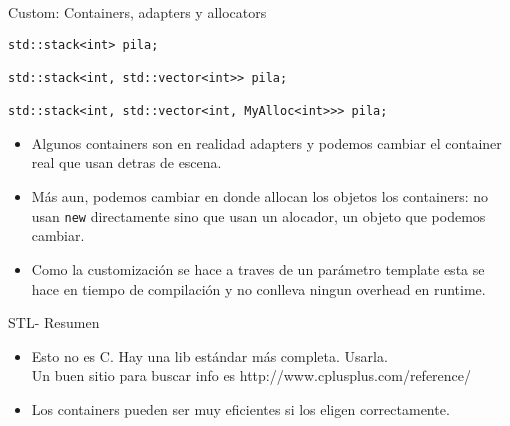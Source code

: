 \begin{frame}[fragile]{Custom: Containers, adapters y allocators}
   \begin{lstlisting}[style=normal]
std::stack<int> pila;

std::stack<int, std::vector<int>> pila;

std::stack<int, std::vector<int, MyAlloc<int>>> pila;
   \end{lstlisting}
   \begin{itemize}
      \item Algunos containers son en realidad adapters y podemos cambiar el container real que usan detras de escena.
      \item M\'as aun, podemos cambiar en donde allocan los objetos los containers: no usan \lstinline[style=normal]!new! directamente sino que usan un alocador, un objeto que podemos cambiar.
      \item Como la customizaci\'on se hace a traves de un par\'ametro template esta se hace en tiempo de compilaci\'on y no conlleva ningun overhead en runtime.
   \end{itemize}
\end{frame}


\begin{frame}[fragile]{STL- Resumen}
   \begin{itemize}
      \item Esto no es C. Hay una lib est\'andar m\'as completa. \alert{Usarla}. \\
      Un buen sitio para buscar info es http://www.cplusplus.com/reference/
      \item Los containers pueden ser muy eficientes si los eligen correctamente.
   \end{itemize}
\end{frame}


